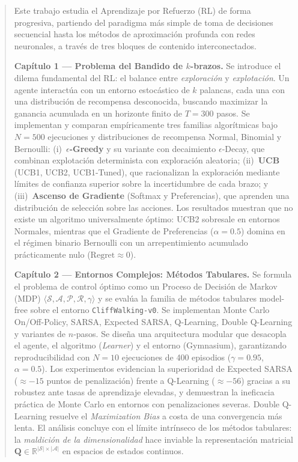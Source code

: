 
\begin{abstract}
\noindent
Este trabajo estudia el Aprendizaje por Refuerzo (RL) de forma progresiva, partiendo del paradigma más simple de toma de decisiones secuencial hasta los métodos de aproximación profunda con redes neuronales, a través de tres bloques de contenido interconectados.

\medskip
\noindent
\textbf{Capítulo 1 — Problema del Bandido de $k$-brazos.}
Se introduce el dilema fundamental del RL: el balance entre \textit{exploración} y \textit{explotación}. Un agente interactúa con un entorno estocástico de $k$ palancas, cada una con una distribución de recompensa desconocida, buscando maximizar la ganancia acumulada en un horizonte finito de $T = 300$ pasos. Se implementan y comparan empíricamente tres familias algorítmicas bajo $N = 500$ ejecuciones y distribuciones de recompensa Normal, Binomial y Bernoulli: (i)~\textbf{$\epsilon$-Greedy} y su variante con decaimiento $\epsilon$-Decay, que combinan explotación determinista con exploración aleatoria; (ii)~\textbf{UCB} (UCB1, UCB2, UCB1-Tuned), que racionalizan la exploración mediante límites de confianza superior sobre la incertidumbre de cada brazo; y (iii)~\textbf{Ascenso de Gradiente} (Softmax y Preferencias), que aprenden una distribución de selección sobre las acciones. Los resultados muestran que no existe un algoritmo universalmente óptimo: UCB2 sobresale en entornos Normales, mientras que el Gradiente de Preferencias ($\alpha = 0.5$) domina en el régimen binario Bernoulli con un arrepentimiento acumulado prácticamente nulo ($\text{Regret} \approx 0$).

\medskip
\noindent
\textbf{Capítulo 2 — Entornos Complejos: Métodos Tabulares.}
Se formula el problema de control óptimo como un Proceso de Decisión de Markov (MDP) $\langle \mathcal{S}, \mathcal{A}, \mathcal{P}, \mathcal{R}, \gamma \rangle$ y se evalúa la familia de métodos tabulares model-free sobre el entorno \texttt{CliffWalking-v0}. Se implementan Monte Carlo On/Off-Policy, SARSA, Expected SARSA, Q-Learning, Double Q-Learning y variantes de $n$-pasos. Se diseña una arquitectura modular que desacopla el agente, el algoritmo (\textit{Learner}) y el entorno (Gymnasium), garantizando reproducibilidad con $N = 10$ ejecuciones de 400 episodios ($\gamma = 0.95$, $\alpha = 0.5$). Los experimentos evidencian la superioridad de Expected SARSA ($\approx{-}15$ puntos de penalización) frente a Q-Learning ($\approx{-}56$) gracias a su robustez ante tasas de aprendizaje elevadas, y demuestran la ineficacia práctica de Monte Carlo en entornos con penalizaciones severas. Double Q-Learning resuelve el \textit{Maximization Bias} a costa de una convergencia más lenta. El análisis concluye con el límite intrínseco de los métodos tabulares: la \textit{maldición de la dimensionalidad} hace inviable la representación matricial $\mathbf{Q} \in \mathbb{R}^{|\mathcal{S}| \times |\mathcal{A}|}$ en espacios de estados continuos.


\end{abstract}
